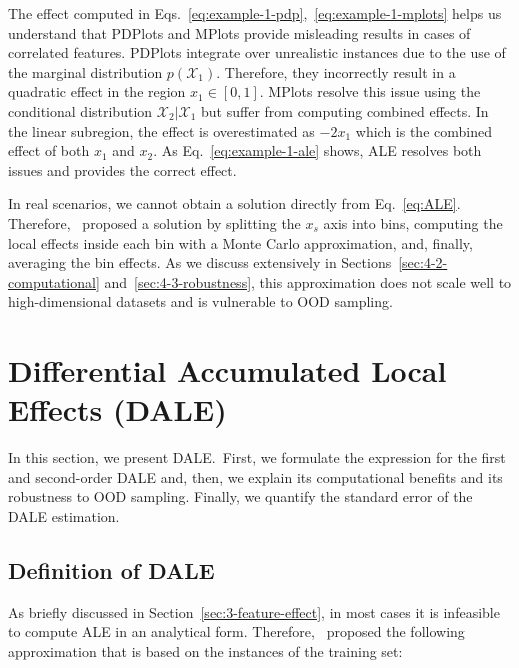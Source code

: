 \documentclass[wcp]{jmlr}
\begin{document}
%
The effect computed in Eqs.~\eqref{eq:example-1-pdp},~\eqref{eq:example-1-mplots} helps us understand that PDPlots and MPlots provide misleading results in cases of correlated features. PDPlots integrate over unrealistic instances due to the use of the marginal distribution \( p(\mathcal{X}_1) \). Therefore, they incorrectly result in a quadratic effect in the region \(x_1 \in [0, 1]\). MPlots resolve this issue using the conditional distribution \( \mathcal{X}_2|\mathcal{X}_1 \) but suffer from computing combined effects. In the linear subregion, the effect is overestimated as \( -2x_1 \) which is the combined effect of both \( x_1 \) and \( x_2 \). As Eq.~\eqref{eq:example-1-ale} shows, ALE resolves both issues and provides the correct effect.

In real scenarios, we cannot obtain a solution directly from Eq.~\eqref{eq:ALE}. Therefore,~\cite{Apley2020} proposed a solution by splitting the \(x_s\) axis into bins, computing the local effects inside each bin with a Monte Carlo approximation, and, finally, averaging the bin effects. As we discuss extensively in Sections~\ref{sec:4-2-computational} and~\ref{sec:4-3-robustness}, this approximation does not scale well to high-dimensional datasets and is vulnerable to OOD sampling.

\section{Differential Accumulated Local Effects (DALE)}

In this section, we present DALE.~First, we formulate the expression
for the first and second-order DALE and, then, we explain its
computational benefits and its robustness to OOD sampling. Finally, we
quantify the standard error of the DALE estimation.

\subsection{Definition of DALE}
\label{sec:4-1-DALE}
As briefly discussed in Section~\ref{sec:3-feature-effect}, in most
cases it is infeasible to compute ALE in an analytical
form. Therefore,~\cite{Apley2020} proposed the following
approximation that is based on the instances of the training set:
\end{document}
